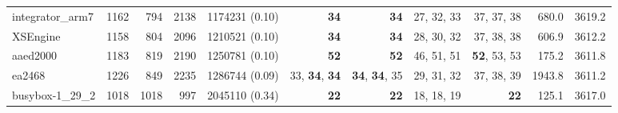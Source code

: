 \begin{table*}
\begin{tiny}
{\begin{tabular}{lrrrrrrrrrr}
integrator\_arm7 & \num[text-series-to-math=true]{1162} & \num[text-series-to-math=true]{794} & \num[text-series-to-math=true]{2138} & \num[text-series-to-math=true]{1174231} (\num[text-series-to-math=true]{0.10}) & \textbf{\num[text-series-to-math=true]{34}} & \textbf{\num[text-series-to-math=true]{34}} & \num[text-series-to-math=true]{27}, \num[text-series-to-math=true]{32}, \num[text-series-to-math=true]{33} & \num[text-series-to-math=true]{37}, \num[text-series-to-math=true]{37}, \num[text-series-to-math=true]{38} & 680.0 & 3619.2\\
XSEngine & \num[text-series-to-math=true]{1158} & \num[text-series-to-math=true]{804} & \num[text-series-to-math=true]{2096} & \num[text-series-to-math=true]{1210521} (\num[text-series-to-math=true]{0.10}) & \textbf{\num[text-series-to-math=true]{34}} & \textbf{\num[text-series-to-math=true]{34}} & \num[text-series-to-math=true]{28}, \num[text-series-to-math=true]{30}, \num[text-series-to-math=true]{32} & \num[text-series-to-math=true]{37}, \num[text-series-to-math=true]{38}, \num[text-series-to-math=true]{38} & 606.9 & 3612.2\\
aaed2000 & \num[text-series-to-math=true]{1183} & \num[text-series-to-math=true]{819} & \num[text-series-to-math=true]{2190} & \num[text-series-to-math=true]{1250781} (\num[text-series-to-math=true]{0.10}) & \textbf{\num[text-series-to-math=true]{52}} & \textbf{\num[text-series-to-math=true]{52}} & \num[text-series-to-math=true]{46}, \num[text-series-to-math=true]{51}, \num[text-series-to-math=true]{51} & \textbf{\num[text-series-to-math=true]{52}}, \num[text-series-to-math=true]{53}, \num[text-series-to-math=true]{53} & 175.2 & 3611.8\\
ea2468 & \num[text-series-to-math=true]{1226} & \num[text-series-to-math=true]{849} & \num[text-series-to-math=true]{2235} & \num[text-series-to-math=true]{1286744} (\num[text-series-to-math=true]{0.09}) & \num[text-series-to-math=true]{33}, \textbf{\num[text-series-to-math=true]{34}}, \textbf{\num[text-series-to-math=true]{34}} & \textbf{\num[text-series-to-math=true]{34}}, \textbf{\num[text-series-to-math=true]{34}}, \num[text-series-to-math=true]{35} & \num[text-series-to-math=true]{29}, \num[text-series-to-math=true]{31}, \num[text-series-to-math=true]{32} & \num[text-series-to-math=true]{37}, \num[text-series-to-math=true]{38}, \num[text-series-to-math=true]{39} & 1943.8 & 3611.2\\
busybox-1\_29\_2 & \num[text-series-to-math=true]{1018} & \num[text-series-to-math=true]{1018} & \num[text-series-to-math=true]{997} & \num[text-series-to-math=true]{2045110} (\num[text-series-to-math=true]{0.34}) & \textbf{\num[text-series-to-math=true]{22}} & \textbf{\num[text-series-to-math=true]{22}} & \num[text-series-to-math=true]{18}, \num[text-series-to-math=true]{18}, \num[text-series-to-math=true]{19} & \textbf{\num[text-series-to-math=true]{22}} & 125.1 & 3617.0\\

\end{tabular}}
\end{tiny}
\end{table*}

